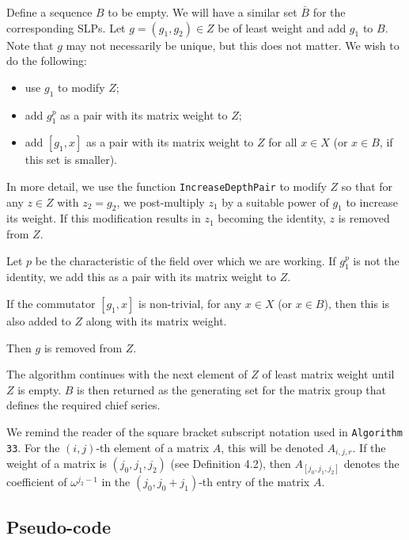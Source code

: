 \documentclass[12pt]{report}
\begin{document}
Define a sequence $B$ to be empty. We will have a similar set $\bar{B}$ for the corresponding SLPs. Let $g = (g_1, g_2) \in Z$ be of least weight and add $g_1$ to $B$. Note that $g$ may not necessarily be unique, but this does not matter. We wish to do the following:

\begin{itemize}
\item use $g_1$ to modify $Z$;
\item add $g_1^p$ as a pair with its matrix weight to $Z$;
\item add $[g_1, x]$ as a pair with its matrix weight to $Z$ for all $x \in X$ (or $x \in B$, if this set is smaller).
\end{itemize}

In more detail, we use the function {\tt IncreaseDepthPair} to modify $Z$ so that for any $z \in Z$ with $z_2 = g_2$, we post-multiply $z_1$ by a suitable power of $g_1$ to increase its weight. If this modification results in $z_1$ becoming the identity, $z$ is removed from $Z$.

Let $p$ be the characteristic of the field over which we are working. If $g_1^p$ is not the identity, we add this as a pair with its matrix weight to $Z$.

If the commutator $[g_1, x]$ is non-trivial, for any $x \in X$ (or $x \in B$), then this is also added to $Z$ along with its matrix weight.

Then $g$ is removed from $Z$.

The algorithm continues with the next element of $Z$ of least matrix weight until $Z$ is empty. $B$ is then returned as the generating set for the matrix group that defines the required chief series.

We remind the reader of the square bracket subscript notation used in {\tt Algorithm 33}. For the $(i, j)$-th element of a matrix $A$, this will be denoted $A_{i, j, r}$. If the weight of a matrix is $(j_0, j_1, j_2)$ (see Definition 4.2), then $A_{[j_0, j_1, j_2]}$ denotes the coefficient of $\omega^{j_2-1}$ in the $(j_0, j_0 + j_1)$-th entry of the matrix $A$.

\subsection{Pseudo-code}
\end{document}
